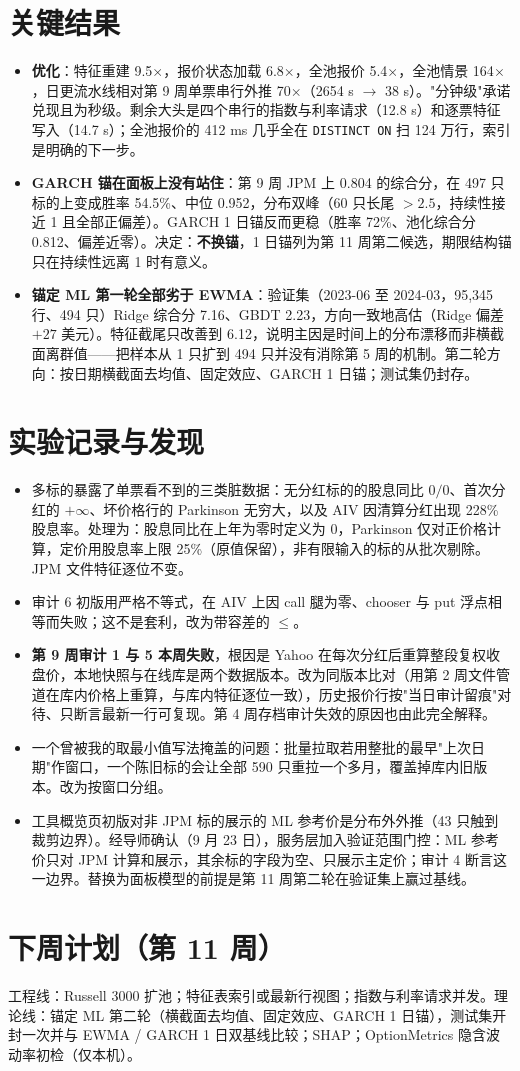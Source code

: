 \documentclass[11pt]{ctexart}
\begin{document}
\section{关键结果}
\begin{itemize}
  \item \textbf{优化}：特征重建 9.5$\times$，报价状态加载 6.8$\times$，全池报价 5.4$\times$，全池情景 164$\times$，日更流水线相对第 9 周单票串行外推 70$\times$（2654 s $\to$ 38 s）。"分钟级"承诺兑现且为秒级。剩余大头是四个串行的指数与利率请求（12.8 s）和逐票特征写入（14.7 s）；全池报价的 412 ms 几乎全在 \texttt{DISTINCT ON} 扫 124 万行，索引是明确的下一步。
  \item \textbf{GARCH 锚在面板上没有站住}：第 9 周 JPM 上 0.804 的综合分，在 497 只标的上变成胜率 54.5\%、中位 0.952，分布双峰（60 只长尾 $>2.5$，持续性接近 1 且全部正偏差）。GARCH 1 日锚反而更稳（胜率 72\%、池化综合分 0.812、偏差近零）。决定：\textbf{不换锚}，1 日锚列为第 11 周第二候选，期限结构锚只在持续性远离 1 时有意义。
  \item \textbf{锚定 ML 第一轮全部劣于 EWMA}：验证集（2023-06 至 2024-03，95{,}345 行、494 只）Ridge 综合分 7.16、GBDT 2.23，方向一致地高估（Ridge 偏差 $+27$ 美元）。特征截尾只改善到 6.12，说明主因是时间上的分布漂移而非横截面离群值——把样本从 1 只扩到 494 只并没有消除第 5 周的机制。第二轮方向：按日期横截面去均值、固定效应、GARCH 1 日锚；测试集仍封存。
\end{itemize}

\section{实验记录与发现}
\begin{itemize}
  \item 多标的暴露了单票看不到的三类脏数据：无分红标的的股息同比 $0/0$、首次分红的 $+\infty$、坏价格行的 Parkinson 无穷大，以及 AIV 因清算分红出现 228\% 股息率。处理为：股息同比在上年为零时定义为 0，Parkinson 仅对正价格计算，定价用股息率上限 25\%（原值保留），非有限输入的标的从批次剔除。JPM 文件特征逐位不变。
  \item 审计 6 初版用严格不等式，在 AIV 上因 call 腿为零、chooser 与 put 浮点相等而失败；这不是套利，改为带容差的 $\le$。
  \item \textbf{第 9 周审计 1 与 5 本周失败}，根因是 Yahoo 在每次分红后重算整段复权收盘价，本地快照与在线库是两个数据版本。改为同版本比对（用第 2 周文件管道在库内价格上重算，与库内特征逐位一致），历史报价行按"当日审计留痕"对待、只断言最新一行可复现。第 4 周存档审计失效的原因也由此完全解释。
  \item 一个曾被我的取最小值写法掩盖的问题：批量拉取若用整批的最早"上次日期"作窗口，一个陈旧标的会让全部 590 只重拉一个多月，覆盖掉库内旧版本。改为按窗口分组。
  \item 工具概览页初版对非 JPM 标的展示的 ML 参考价是分布外外推（43 只触到裁剪边界）。经导师确认（9 月 23 日），服务层加入验证范围门控：ML 参考价只对 JPM 计算和展示，其余标的字段为空、只展示主定价；审计 4 断言这一边界。替换为面板模型的前提是第 11 周第二轮在验证集上赢过基线。
\end{itemize}

\section{下周计划（第 11 周）}
工程线：Russell 3000 扩池；特征表索引或最新行视图；指数与利率请求并发。理论线：锚定 ML 第二轮（横截面去均值、固定效应、GARCH 1 日锚），测试集开封一次并与 EWMA / GARCH 1 日双基线比较；SHAP；OptionMetrics 隐含波动率初检（仅本机）。
\end{document}
